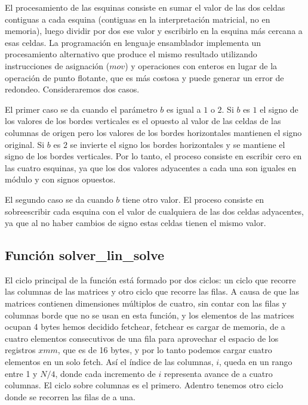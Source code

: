 \par El procesamiento de las esquinas consiste en sumar el valor de las dos celdas contiguas a cada esquina (contiguas en la interpretación matricial, no en memoria), luego dividir por dos ese valor y escribirlo en la esquina más cercana a esas celdas. La programación en lenguaje ensamblador implementa un procesamiento alternativo que produce el mismo resultado utilizando instrucciones de asignación ($mov$) y operaciones con enteros en lugar de la operación de punto flotante, que es más costosa y puede generar un error de redondeo. Consideraremos dos casos.\newline
\par El primer caso se da cuando el parámetro $b$ es igual a $1$ o $2$. Si $b$ es $1$ el signo de los valores de los bordes verticales es el opuesto al valor de las celdas de las columnas de origen pero los valores de los bordes horizontales mantienen el signo original. Si $b$ es $2$ se invierte el signo los bordes horizontales y se mantiene el signo de los bordes verticales. Por lo tanto, el proceso consiste en escribir cero en las cuatro esquinas, ya que los dos valores adyacentes a cada una son iguales en módulo y con signos opuestos.\newline
\par El segundo caso se da cuando $b$ tiene otro valor. El proceso consiste en sobreescribir cada esquina con el valor de cualquiera de las dos celdas adyacentes, ya que al no haber cambios de signo estas celdas tienen el mismo valor.\newline

\subsection{Función solver\_lin\_solve}
\par El ciclo principal de la función está formado por dos ciclos: un ciclo que recorre las columnas de las matrices y otro ciclo que recorre las filas. A causa de que las matrices contienen dimensiones múltiplos de cuatro, sin contar con las filas y columnas borde que no se usan en esta función, y los elementos de las matrices ocupan 4 bytes hemos decidido fetchear, fetchear es cargar de memoria, de a cuatro elementos consecutivos de una fila para aprovechar el espacio de los registros $xmm$, que es de 16 bytes, y por lo tanto podemos cargar cuatro elementos en un solo fetch. Así el índice de
las columnas, $i$, queda en un rango entre 1 y $N/4$, donde cada incremento de $i$ representa avance de a cuatro columnas. El ciclo sobre columnas es el primero. Adentro tenemos otro ciclo donde se recorren las filas de a una. \newline

